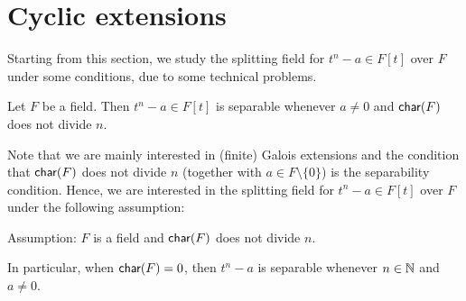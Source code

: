 \section{Cyclic extensions}

Starting from this section, we study the splitting field for $t^n-a\in F[t]$ over $F$ under some conditions, due to some technical problems.
\begin{obs}
    Let $F$ be a field.
    Then $t^n-a\in F[t]$ is separable whenever $a\neq 0$ and ${\textsf{char}({F})}$ does not divide $n$.
\end{obs}
Note that we are mainly interested in (finite) Galois extensions and the condition that ${\textsf{char}({F})}$ does not divide $n$ (together with $a\in F\setminus\{0\}$) is the separability condition.
Hence, we are interested in the splitting field for $t^n-a\in F[t]$ over $F$ under the following assumption:
\begin{center}
    Assumption: $F$ is a field and ${\textsf{char}({F})}$ does not divide $n$.
\end{center}
In particular, when ${\textsf{char}({F})}=0$, then $t^n-a$ is separable whenever $n\in{\mathbb{N}}$ and $a\neq 0$.

